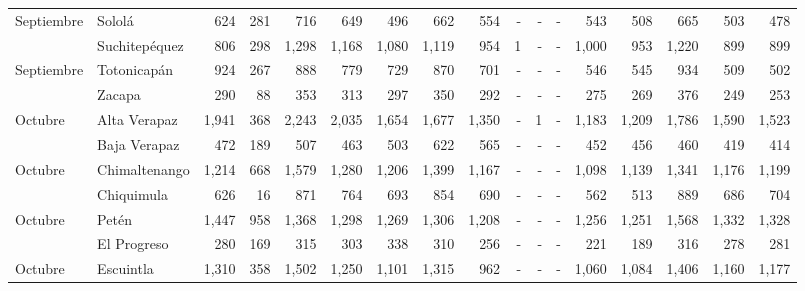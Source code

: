 \begin{landscape}
\begin{center}
\begin{longtable}{llrrrrrrrrrrrrrrr}
			\multicolumn{1}{l}{	\footnotesize	 Septiembre 	}&	 Sololá 	&	 624 	&	 281 	&	 716 	&	 649 	&	 496 	&	 662 	&	 554 	&	 -   	&	 -   	&	 -   	&	 543 	&	 508 	&	 665 	&	 503 	&	 478 	\\
			\rowcolor{color1!5!white}\multicolumn{1}{l}{	\footnotesize	 Septiembre 	}&	 Suchitepéquez 	&	 806 	&	 298 	&	 1,298 	&	 1,168 	&	 1,080 	&	 1,119 	&	 954 	&	 1 	&	 -   	&	 -   	&	 1,000 	&	 953 	&	 1,220 	&	 899 	&	 899 	\\
			\multicolumn{1}{l}{	\footnotesize	 Septiembre 	}&	 Totonicapán 	&	 924 	&	 267 	&	 888 	&	 779 	&	 729 	&	 870 	&	 701 	&	 -   	&	 -   	&	 -   	&	 546 	&	 545 	&	 934 	&	 509 	&	 502 	\\
			\rowcolor{color1!5!white}\multicolumn{1}{l}{	\footnotesize	 Septiembre 	}&	 Zacapa 	&	 290 	&	 88 	&	 353 	&	 313 	&	 297 	&	 350 	&	 292 	&	 -   	&	 -   	&	 -   	&	 275 	&	 269 	&	 376 	&	 249 	&	 253 	\\
			\multicolumn{1}{l}{	\footnotesize	 Octubre 	}&	 Alta Verapaz 	&	 1,941 	&	 368 	&	 2,243 	&	 2,035 	&	 1,654 	&	 1,677 	&	 1,350 	&	 -   	&	 1 	&	 -   	&	 1,183 	&	 1,209 	&	 1,786 	&	 1,590 	&	 1,523 	\\
			\rowcolor{color1!5!white}\multicolumn{1}{l}{	\footnotesize	 Octubre 	}&	 Baja Verapaz 	&	 472 	&	 189 	&	 507 	&	 463 	&	 503 	&	 622 	&	 565 	&	 -   	&	 -   	&	 -   	&	 452 	&	 456 	&	 460 	&	 419 	&	 414 	\\
			\multicolumn{1}{l}{	\footnotesize	 Octubre 	}&	 Chimaltenango 	&	 1,214 	&	 668 	&	 1,579 	&	 1,280 	&	 1,206 	&	 1,399 	&	 1,167 	&	 -   	&	 -   	&	 -   	&	 1,098 	&	 1,139 	&	 1,341 	&	 1,176 	&	 1,199 	\\
			\rowcolor{color1!5!white}\multicolumn{1}{l}{	\footnotesize	 Octubre 	}&	 Chiquimula 	&	 626 	&	 16 	&	 871 	&	 764 	&	 693 	&	 854 	&	 690 	&	 -   	&	 -   	&	 -   	&	 562 	&	 513 	&	 889 	&	 686 	&	 704 	\\
			\multicolumn{1}{l}{	\footnotesize	 Octubre 	}&	 Petén 	&	 1,447 	&	 958 	&	 1,368 	&	 1,298 	&	 1,269 	&	 1,306 	&	 1,208 	&	 -   	&	 -   	&	 -   	&	 1,256 	&	 1,251 	&	 1,568 	&	 1,332 	&	 1,328 	\\
			\rowcolor{color1!5!white}\multicolumn{1}{l}{	\footnotesize	 Octubre 	}&	 El Progreso 	&	 280 	&	 169 	&	 315 	&	 303 	&	 338 	&	 310 	&	 256 	&	 -   	&	 -   	&	 -   	&	 221 	&	 189 	&	 316 	&	 278 	&	 281 	\\
			\multicolumn{1}{l}{	\footnotesize	 Octubre 	}&	 Escuintla 	&	 1,310 	&	 358 	&	 1,502 	&	 1,250 	&	 1,101 	&	 1,315 	&	 962 	&	 -   	&	 -   	&	 -   	&	 1,060 	&	 1,084 	&	 1,406 	&	 1,160 	&	 1,177 	\\

\end{longtable}
\end{center}
\end{landscape}
